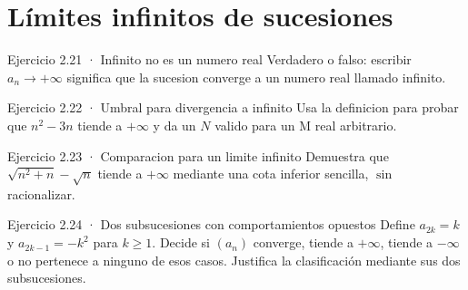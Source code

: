 \documentclass[10pt,a4paper,oneside,openany]{book}
\begin{document}
\section{Límites infinitos de sucesiones}
\begin{PSevenExerciseFixed}{Ejercicio 2.21 · Infinito no es un numero real}
Verdadero o falso: escribir \(a_n\to +\infty \) significa que la sucesion converge a un numero real llamado infinito.
\end{PSevenExerciseFixed}
\begin{PSevenExerciseFixed}{Ejercicio 2.22 · Umbral para divergencia a infinito}
Usa la definicion para probar que \(n^{2}-3n\) tiende a \(+\infty \) y da un \(N\) valido para un M real arbitrario.
\end{PSevenExerciseFixed}
\begin{PSevenExerciseFixed}{Ejercicio 2.23 · Comparacion para un limite infinito}
Demuestra que \(\sqrt{n^{2}+n}-\sqrt{n}\) tiende a \(+\infty \) mediante una cota inferior sencilla, \(\sin\) racionalizar.
\end{PSevenExerciseFixed}
\begin{PSevenExerciseFixed}{Ejercicio 2.24 · Dos subsucesiones con comportamientos opuestos}
Define \(a_{2k}=k\) y \(a_{2k-1}=-k^2\) para \(k\ge1\). Decide si \((a_n)\) converge, tiende a \(+\infty\), tiende a \(-\infty\) o no pertenece a ninguno de esos casos. Justifica la clasificación mediante sus dos subsucesiones.
\end{PSevenExerciseFixed}
\end{document}
